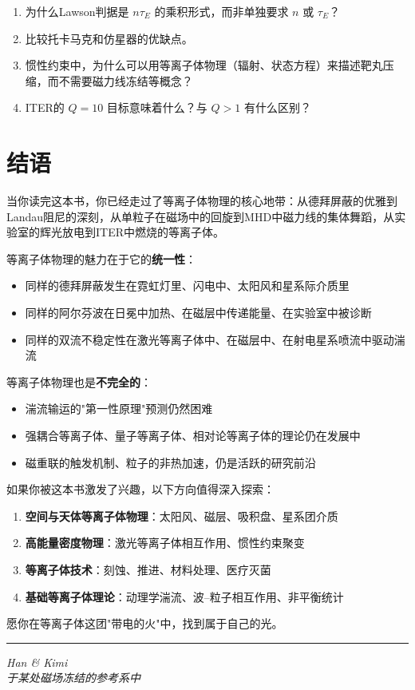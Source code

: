 \documentclass[12pt,a4paper,openany,oneside]{book}
\begin{document}
\begin{miniquiz}
\begin{enumerate}
\item 为什么Lawson判据是 $n\tau_E$ 的乘积形式，而非单独要求 $n$ 或 $\tau_E$？
\item 比较托卡马克和仿星器的优缺点。
\item 惯性约束中，为什么可以用等离子体物理（辐射、状态方程）来描述靶丸压缩，而不需要磁力线冻结等概念？
\item ITER的 $Q=10$ 目标意味着什么？与 $Q>1$ 有什么区别？
\end{enumerate}
\end{miniquiz}


\chapter*{结语}

当你读完这本书，你已经走过了等离子体物理的核心地带：从德拜屏蔽的优雅到Landau阻尼的深刻，从单粒子在磁场中的回旋到MHD中磁力线的集体舞蹈，从实验室的辉光放电到ITER中燃烧的等离子体。

等离子体物理的魅力在于它的\textbf{统一性}：
\begin{itemize}
\item 同样的德拜屏蔽发生在霓虹灯里、闪电中、太阳风和星系际介质里
\item 同样的阿尔芬波在日冕中加热、在磁层中传递能量、在实验室中被诊断
\item 同样的双流不稳定性在激光等离子体中、在磁层中、在射电星系喷流中驱动湍流
\end{itemize}

等离子体物理也是\textbf{不完全的}：
\begin{itemize}
\item 湍流输运的"第一性原理"预测仍然困难
\item 强耦合等离子体、量子等离子体、相对论等离子体的理论仍在发展中
\item 磁重联的触发机制、粒子的非热加速，仍是活跃的研究前沿
\end{itemize}

如果你被这本书激发了兴趣，以下方向值得深入探索：
\begin{enumerate}
\item \textbf{空间与天体等离子体物理}：太阳风、磁层、吸积盘、星系团介质
\item \textbf{高能量密度物理}：激光等离子体相互作用、惯性约束聚变
\item \textbf{等离子体技术}：刻蚀、推进、材料处理、医疗灭菌
\item \textbf{基础等离子体理论}：动理学湍流、波--粒子相互作用、非平衡统计
\end{enumerate}

愿你在等离子体这团"带电的火"中，找到属于自己的光。

\vspace{2em}
\noindent\rule{\textwidth}{0.4pt}
\vspace{1em}

\begin{flushright}
\textit{Han \& Kimi}\\
\textit{于某处磁场冻结的参考系中}
\end{flushright}

\printindex
\end{document}
